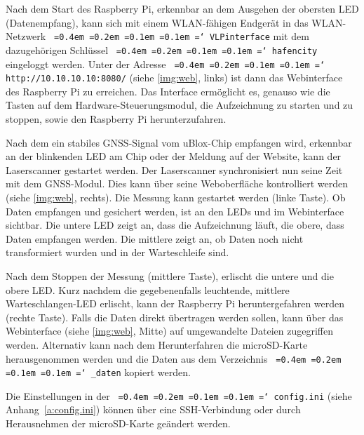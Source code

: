 \documentclass[a4paper,12pt,bibliography=totoc, listof=totoc,titlepage,pointlessnumbers]{scrreprt}
\newcommand*\justify{%
  \fontdimen2\font=0.4em%
  \fontdimen3\font=0.2em%
  \fontdimen4\font=0.1em%
  \fontdimen7\font=0.1em%
  \hyphenchar\font=`\-%
}
\newcommand{\code}[1]{\texttt{\justify{#1}}}
\begin{document}
Nach dem Start des Raspberry Pi, erkennbar an dem Ausgehen der obersten LED (Datenempfang), kann sich mit einem WLAN-fähigen Endgerät in das WLAN-Netzwerk \code{VLPinterface} mit dem dazugehörigen Schlüssel \code{hafencity} eingeloggt werden. Unter der Adresse \code{http://10.10.10.10:8080/} (siehe \autoref{img:web}, links) ist dann das Webinterface des Raspberry Pi zu erreichen. Das Interface ermöglicht es, genauso wie die Tasten auf dem Hardware-Steuerungsmodul, die Aufzeichnung zu starten und zu stoppen, sowie den Raspberry Pi herunterzufahren.

Nach dem ein stabiles GNSS-Signal vom uBlox-Chip empfangen wird, erkennbar an der blinkenden LED am Chip oder der Meldung auf der Website, kann der Laserscanner gestartet werden. Der Laserscanner synchronisiert nun seine Zeit mit dem GNSS-Modul. Dies kann über seine Weboberfläche kontrolliert werden (siehe \autoref{img:web}, rechts). Die Messung kann gestartet werden (linke Taste). Ob Daten empfangen und gesichert werden, ist an den LEDs und im Webinterface sichtbar. Die untere LED zeigt an, dass die Aufzeichnung läuft, die obere, dass Daten empfangen werden. Die mittlere zeigt an, ob Daten noch nicht transformiert wurden und in der Warteschleife sind.

Nach dem Stoppen der Messung (mittlere Taste), erlischt die untere und die obere LED. Kurz nachdem die gegebenenfalls leuchtende, mittlere Warteschlangen-LED erlischt, kann der Raspberry Pi heruntergefahren werden (rechte Taste).
Falls die Daten direkt übertragen werden sollen, kann über das Webinterface (siehe \autoref{img:web}, Mitte) auf umgewandelte Dateien zugegriffen werden. Alternativ kann nach dem Herunterfahren die microSD-Karte herausgenommen werden und die Daten aus dem Verzeichnis \code{\_daten} kopiert werden.

Die Einstellungen in der \code{config.ini} (siehe Anhang~\ref{a:config.ini}) können über eine SSH-Verbindung oder durch Herausnehmen der microSD-Karte geändert werden.
\end{document}
